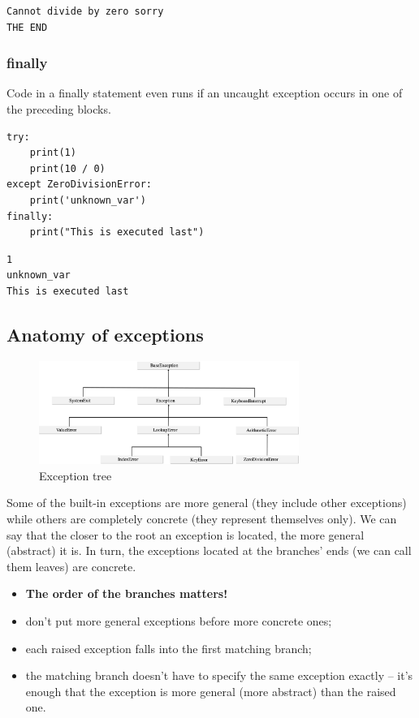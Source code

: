 \documentclass[11pt]{article}
\begin{document}
\begin{verbatim}
Cannot divide by zero sorry
THE END
\end{verbatim}



\newpage
\subsubsection{finally}
\label{sec:org78c601e}
Code in a finally statement even runs if an uncaught exception occurs
in one of the preceding blocks.

\begin{verbatim}
try:
    print(1)
    print(10 / 0)
except ZeroDivisionError:
    print('unknown_var')
finally:
    print("This is executed last")
\end{verbatim}

\begin{verbatim}
1
unknown_var
This is executed last
\end{verbatim}

\subsection{Anatomy of exceptions}
\label{sec:org75e01a4}

\begin{figure}[htbp]
\centering
\includegraphics[width=320px]{./images/exceptions.png}
\caption{Exception tree}
\end{figure}

Some of the built-in exceptions are more general (they include other
exceptions) while others are completely concrete (they represent
themselves only). We can say that the closer to the root an exception
is located, the more general (abstract) it is. In turn, the exceptions
located at the branches’ ends (we can call them leaves) are concrete.

\begin{itemize}
\item \textbf{The order of the branches matters!}
\item don’t put more general exceptions before more concrete ones;
\item each raised exception falls into the first matching branch;
\item the matching branch doesn’t have to specify the same exception
exactly – it’s enough that the exception is more general (more
abstract) than the raised one.
\end{itemize}
\end{document}
